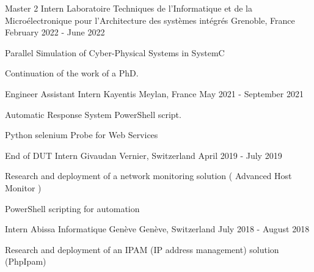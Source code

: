 

\begin{cventries}

  \cventry
    {Master 2 Intern} %
    {Laboratoire Techniques de l'Informatique et de la Microélectronique pour l'Architecture des systèmes intégrés} %
    {Grenoble, France} %
    {February 2022 - June 2022} %
    {
      \begin{cvitems} %
        \item{Parallel Simulation of Cyber-Physical Systems in SystemC}
        \item{Continuation of the work of a PhD.}
      \end{cvitems}
    }

  \cventry
    {Engineer Assistant Intern} %
    {Kayentis} %
    {Meylan, France} %
    {May 2021 - September 2021} %
    {
      \begin{cvitems} %
        \item {Automatic Response System PowerShell script.}
        \item {Python selenium Probe for Web Services}
      \end{cvitems}
    }

  \cventry
    {End of DUT Intern} %
    {Givaudan} %
    {Vernier, Switzerland} %
    {April 2019 - July 2019} %
    {
      \begin{cvitems} %
        \item {Research and deployment of a network monitoring solution ( Advanced Host Monitor )}
        \item {PowerShell scripting for automation}
      \end{cvitems}
    }
  \cventry
    {Intern} %
    {Abissa Informatique Genève} %
    {Genève, Switzerland} %
    {July 2018 - August 2018} %
    {
      \begin{cvitems} %
        \item {Research and deployment of an IPAM (IP address management) solution (PhpIpam)}
      \end{cvitems}
    }
\end{cventries}
